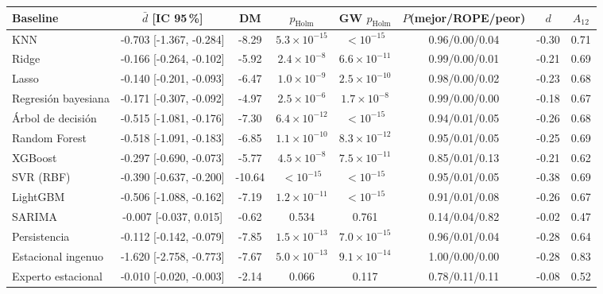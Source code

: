 \begin{tabular}{lccccccc}
\toprule
Baseline & $\bar d$ [IC 95\,\%] & DM & $p_{\mathrm{Holm}}$ & GW $p_{\mathrm{Holm}}$ & $P$(mejor/ROPE/peor) & $d$ & $A_{12}$ \\
\midrule
KNN & -0.703 [-1.367, -0.284] & -8.29 & $5.3\times10^{-15}$ & $<10^{-15}$ & 0.96/0.00/0.04 & -0.30 & 0.71 \\
Ridge & -0.166 [-0.264, -0.102] & -5.92 & $2.4\times10^{-8}$ & $6.6\times10^{-11}$ & 0.99/0.00/0.01 & -0.21 & 0.69 \\
Lasso & -0.140 [-0.201, -0.093] & -6.47 & $1.0\times10^{-9}$ & $2.5\times10^{-10}$ & 0.98/0.00/0.02 & -0.23 & 0.68 \\
Regresión bayesiana & -0.171 [-0.307, -0.092] & -4.97 & $2.5\times10^{-6}$ & $1.7\times10^{-8}$ & 0.99/0.00/0.00 & -0.18 & 0.67 \\
Árbol de decisión & -0.515 [-1.081, -0.176] & -7.30 & $6.4\times10^{-12}$ & $<10^{-15}$ & 0.94/0.01/0.05 & -0.26 & 0.68 \\
Random Forest & -0.518 [-1.091, -0.183] & -6.85 & $1.1\times10^{-10}$ & $8.3\times10^{-12}$ & 0.95/0.01/0.05 & -0.25 & 0.69 \\
XGBoost & -0.297 [-0.690, -0.073] & -5.77 & $4.5\times10^{-8}$ & $7.5\times10^{-11}$ & 0.85/0.01/0.13 & -0.21 & 0.62 \\
SVR (RBF) & -0.390 [-0.637, -0.200] & -10.64 & $<10^{-15}$ & $<10^{-15}$ & 0.95/0.01/0.05 & -0.38 & 0.69 \\
LightGBM & -0.506 [-1.088, -0.162] & -7.19 & $1.2\times10^{-11}$ & $<10^{-15}$ & 0.91/0.01/0.08 & -0.26 & 0.67 \\
SARIMA & -0.007 [-0.037, 0.015] & -0.62 & 0.534 & 0.761 & 0.14/0.04/0.82 & -0.02 & 0.47 \\
Persistencia & -0.112 [-0.142, -0.079] & -7.85 & $1.5\times10^{-13}$ & $7.0\times10^{-15}$ & 0.96/0.01/0.04 & -0.28 & 0.64 \\
Estacional ingenuo & -1.620 [-2.758, -0.773] & -7.67 & $5.0\times10^{-13}$ & $9.1\times10^{-14}$ & 1.00/0.00/0.00 & -0.28 & 0.83 \\
Experto estacional & -0.010 [-0.020, -0.003] & -2.14 & 0.066 & 0.117 & 0.78/0.11/0.11 & -0.08 & 0.52 \\
\bottomrule
\end{tabular}